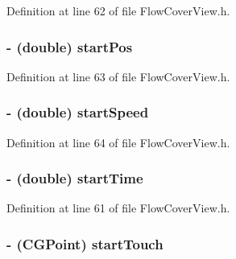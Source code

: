Definition at line 62 of file FlowCoverView.h.

\hypertarget{interface_flow_cover_view_a55ce5cf7840850f6ed838404916a48ba}{
\subsubsection[{startPos}]{\setlength{\rightskip}{0pt plus 5cm}-\/ (double) {\bf startPos}}}
\label{interface_flow_cover_view_a55ce5cf7840850f6ed838404916a48ba}


Definition at line 63 of file FlowCoverView.h.

\hypertarget{interface_flow_cover_view_a35a653c4b8539d4059c697f60c81fa1d}{
\subsubsection[{startSpeed}]{\setlength{\rightskip}{0pt plus 5cm}-\/ (double) {\bf startSpeed}}}
\label{interface_flow_cover_view_a35a653c4b8539d4059c697f60c81fa1d}


Definition at line 64 of file FlowCoverView.h.

\hypertarget{interface_flow_cover_view_a0a07a521d3525b9b7dc70c0a625adea0}{
\subsubsection[{startTime}]{\setlength{\rightskip}{0pt plus 5cm}-\/ (double) {\bf startTime}}}
\label{interface_flow_cover_view_a0a07a521d3525b9b7dc70c0a625adea0}


Definition at line 61 of file FlowCoverView.h.

\hypertarget{interface_flow_cover_view_acaf7025590c212741e6217f30fb042be}{
\subsubsection[{startTouch}]{\setlength{\rightskip}{0pt plus 5cm}-\/ (CGPoint) {\bf startTouch}}}
\label{interface_flow_cover_view_acaf7025590c212741e6217f30fb042be}


